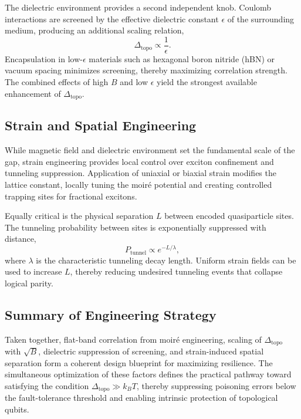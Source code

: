 \documentclass[aps,prl,twocolumn,superscriptaddress]{revtex4-2}
\begin{document}
The dielectric environment provides a second independent knob. Coulomb interactions are screened by the effective dielectric constant $\epsilon$ of the surrounding medium, producing an additional scaling relation,
\begin{equation}
\Delta_{\text{topo}} \propto \frac{1}{\epsilon}.
\end{equation}
Encapsulation in low-$\epsilon$ materials such as hexagonal boron nitride (hBN) or vacuum spacing minimizes screening, thereby maximizing correlation strength. The combined effects of high $B$ and low $\epsilon$ yield the strongest available enhancement of $\Delta_{\text{topo}}$.

\subsection{Strain and Spatial Engineering}
While magnetic field and dielectric environment set the fundamental scale of the gap, strain engineering provides local control over exciton confinement and tunneling suppression. Application of uniaxial or biaxial strain modifies the lattice constant, locally tuning the moiré potential and creating controlled trapping sites for fractional excitons. 

Equally critical is the physical separation $L$ between encoded quasiparticle sites. The tunneling probability between sites is exponentially suppressed with distance,
\begin{equation}
P_{\text{tunnel}} \propto e^{-L/\lambda},
\end{equation}
where $\lambda$ is the characteristic tunneling decay length. Uniform strain fields can be used to increase $L$, thereby reducing undesired tunneling events that collapse logical parity. 

\subsection{Summary of Engineering Strategy}
Taken together, flat-band correlation from moiré engineering, scaling of $\Delta_{\text{topo}}$ with $\sqrt{B}$, dielectric suppression of screening, and strain-induced spatial separation form a coherent design blueprint for maximizing resilience. The simultaneous optimization of these factors defines the practical pathway toward satisfying the condition $\Delta_{\text{topo}} \gg k_B T$, thereby suppressing poisoning errors below the fault-tolerance threshold and enabling intrinsic protection of topological qubits.
\end{document}
